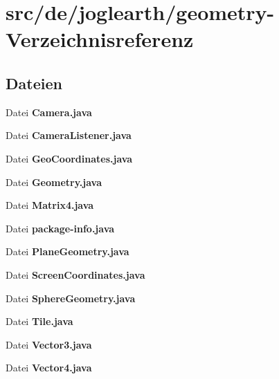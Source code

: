 \section{src/de/joglearth/geometry-\/\-Verzeichnisreferenz}
\label{dir_c0ff63119d263ea4d1c46a9b982d5c97}
\subsection*{Dateien}
\begin{DoxyCompactItemize}
\item 
Datei {\bfseries Camera.\-java}
\item 
Datei {\bfseries Camera\-Listener.\-java}
\item 
Datei {\bfseries Geo\-Coordinates.\-java}
\item 
Datei {\bfseries Geometry.\-java}
\item 
Datei {\bfseries Matrix4.\-java}
\item 
Datei {\bfseries package-\/info.\-java}
\item 
Datei {\bfseries Plane\-Geometry.\-java}
\item 
Datei {\bfseries Screen\-Coordinates.\-java}
\item 
Datei {\bfseries Sphere\-Geometry.\-java}
\item 
Datei {\bfseries Tile.\-java}
\item 
Datei {\bfseries Vector3.\-java}
\item 
Datei {\bfseries Vector4.\-java}
\end{DoxyCompactItemize}
